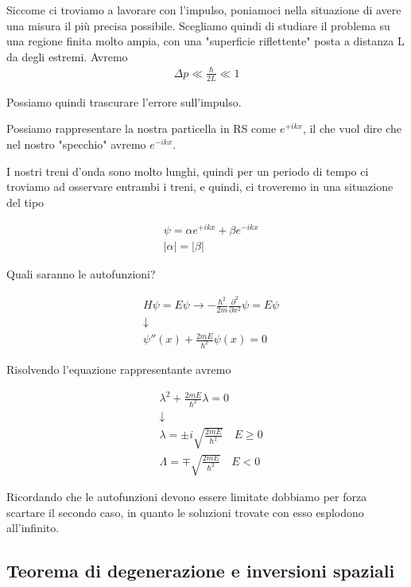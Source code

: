 Siccome ci troviamo a lavorare con l'impulso, poniamoci nella situazione di avere una misura il più precisa possibile. Scegliamo quindi di studiare il problema su una regione finita molto ampia, con una "superficie riflettente" posta a distanza L da degli estremi.
Avremo
\begin{align}
\Delta p \ll \frac{\hbar}{2 L } \ll 1
\end{align}

Possiamo quindi trascurare l'errore sull'impulso. 

Possiamo rappresentare la nostra particella in RS come 
$e^{+ikx}$, il che vuol dire che nel nostro "specchio" avremo $e^{-ikx}$.

I nostri treni d'onda sono molto lunghi, quindi per un periodo di tempo ci troviamo ad osservare entrambi i treni, e quindi, ci troveremo in una situazione del tipo

\begin{align}
{}&\psi= \alpha e^{+ikx} + \beta e^{-ikx} \\
&|\alpha|=|\beta|  
\end{align}

\newpage

Quali saranno le autofunzioni?

\begin{align}
{}&H\psi= E\psi \rightarrow -\frac{\hbar^2}{2m} \frac{\partial^2}{\partial x^2}\psi = E\psi \\
&\downarrow \nonumber \\
&\psi''(x) + \frac{2mE}{\hbar^2}\psi(x)=0
\end{align}

Risolvendo l'equazione rappresentante avremo

\begin{align}
&\lambda^2 + \frac{2mE}{\hbar^2}\lambda=0 \nonumber \\
&\downarrow \nonumber \\
&\lambda = \pm i \sqrt{\frac{2mE}{\hbar^2}} \quad E \geq 0 \\
&\Lambda = \mp \sqrt{\frac{2mE}{\hbar^2}} \quad E < 0
\end{align}

Ricordando che le autofunzioni devono essere limitate dobbiamo per forza scartare il secondo caso, in quanto le soluzioni trovate con esso esplodono all'infinito.


\subsection{Teorema di degenerazione e inversioni spaziali}

